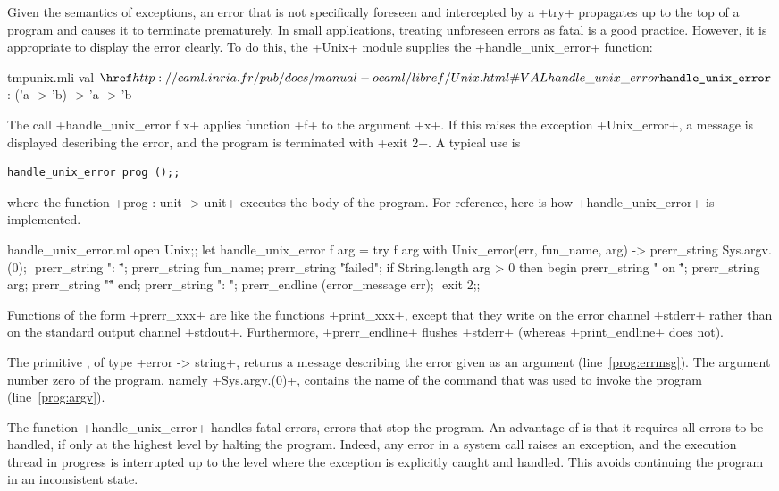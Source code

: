 Given the semantics of exceptions, an error that is not specifically
foreseen and intercepted by a \ml+try+ propagates up to the top of a
program and causes it to terminate prematurely.  In small
applications, treating unforeseen errors as fatal is a good practice.
However, it is appropriate to display the error clearly. To do this,
the \ml+Unix+ module supplies the \ml+handle_unix_error+ function:
%
\begin{listingcodefile}{tmpunix.mli}
val $\indexlibvalue{Unix}{handle\_unix\_error}$ : ('a -> 'b) -> 'a -> 'b
\end{listingcodefile}
%
The call  \ml+handle_unix_error f x+ applies function  \ml+f+ to the
argument \ml+x+. If this raises the exception \ml+Unix_error+, a
message is displayed describing the error, and the program is
terminated with  \ml+exit 2+. A typical use is
%
\begin{lstlisting}
handle_unix_error prog ();;
\end{lstlisting}
% 
where the function \ml+prog : unit -> unit+ executes the body of the
program. For reference, here is how \ml+handle_unix_error+ is
implemented.
%
\begin{listingcodefile}[style=numbers]{handle_unix_error.ml}
open Unix;;
let handle_unix_error f arg =
  try
    f arg
  with Unix_error(err, fun_name, arg) ->
    prerr_string Sys.argv.(0); $\label{prog:argv}$
    prerr_string ": \"";
    prerr_string fun_name;
    prerr_string "\" failed";
    if String.length arg > 0 then begin
      prerr_string " on \"";
      prerr_string arg;
      prerr_string "\""
    end;
    prerr_string ": ";
    prerr_endline (error_message err); $\label{prog:errmsg}$
    exit 2;;
\end{listingcodefile}
% 
Functions of the form \ml+prerr_xxx+ are like the functions
\ml+print_xxx+, except that they write on the error channel
\ml+stderr+ rather than on the standard output channel \ml+stdout+.
Furthermore, \ml+prerr_endline+ flushes \ml+stderr+ (whereas
\ml+print_endline+ does not).

The primitive , of type 
\ml+error -> string+, returns a message describing the error given as an
argument (line~\ref{prog:errmsg}). The argument number zero of the
program, namely \ml+Sys.argv.(0)+, contains the name of the command
that was used to invoke the program (line~\ref{prog:argv}).

The function \ml+handle_unix_error+ handles fatal errors, \ie{} errors
that stop the program.  An advantage of {\ocaml} is that it requires
all errors to be handled, if only at the highest level by
halting the program. Indeed, any error in a system call raises an
exception, and the execution thread in progress is interrupted up to
the level where the exception is explicitly caught and handled. This avoids
continuing the program in an inconsistent state.

